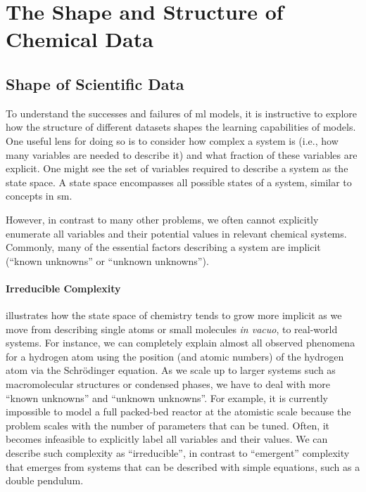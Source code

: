 \section{The Shape and Structure of Chemical Data} \label{sec:data-section}


\subsection{Shape of Scientific Data}
To understand the successes and failures of \gls{ml} models, it is instructive to explore how the structure of different datasets shapes the learning capabilities of models. 
One useful lens for doing so is to consider how complex a system is (i.e., how many variables are needed to describe it) and what fraction of these variables are explicit. 
One might see the set of variables required to describe a system as the state space. 
A state space encompasses all possible states of a system, similar to concepts in \gls{sm}. 

However, in contrast to many other problems, we often cannot explicitly enumerate all variables and their potential values in relevant chemical systems. 
Commonly, many of the essential factors describing a system are implicit (\enquote{known unknowns} or \enquote{unknown unknowns}). 

\paragraph{Irreducible Complexity}
 illustrates how the state space of chemistry tends to grow more implicit as we move from describing single atoms or small molecules \textit{in vacuo}, to real-world systems. 
For instance, we can completely explain almost all observed phenomena for a hydrogen atom using the position (and atomic numbers) of the hydrogen atom via the Schrödinger equation. 
As we scale up to larger systems such as macromolecular structures or condensed phases, we have to deal with more \enquote{known unknowns} and \enquote{unknown unknowns}.\autocite{martin2022bridging}
For example, it is currently impossible to model a full packed-bed reactor at the atomistic scale because the problem scales with the number of parameters that can be tuned. Often, it becomes infeasible to explicitly label all variables and their values. 
We can describe such complexity as \enquote{irreducible}\autocite{Pietsch_2017}, in contrast to \enquote{emergent} complexity that emerges from systems that can be described with simple equations, such as a double pendulum.


